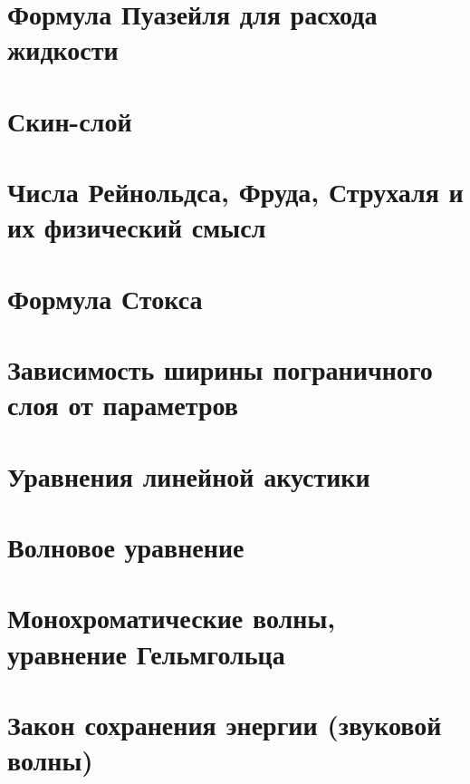 \documentclass[10pt,landscape,a4paper]{article}
\begin{document}
\begin{multicols*}{5}
		\section{Формула Пуазейля для расхода жидкости}
		\section{Скин-слой}
		\section{Числа Рейнольдса, Фруда, Струхаля и их физический смысл}
		\section{Формула Стокса}
		\section{Зависимость ширины пограничного слоя от параметров}
		\section{Уравнения линейной акустики}
		\section{Волновое уравнение}
		\section{Монохроматические волны, уравнение Гельмгольца}
		\section{Закон сохранения энергии (звуковой волны)}
	\end{multicols*}
\end{document}
